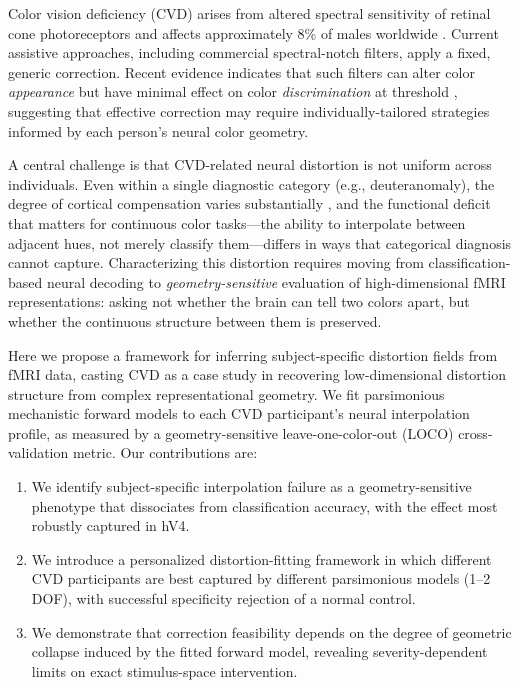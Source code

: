 \documentclass{article}
\begin{document}
Color vision deficiency (CVD) arises from altered spectral sensitivity of retinal cone photoreceptors and affects approximately 8\% of males worldwide \citep{machado2009}.
Current assistive approaches, including commercial spectral-notch filters, apply a fixed, generic correction.
Recent evidence indicates that such filters can alter color \emph{appearance} but have minimal effect on color \emph{discrimination} at threshold \citep{somers2024}, suggesting that effective correction may require individually-tailored strategies informed by each person's neural color geometry.

A central challenge is that CVD-related neural distortion is not uniform across individuals.
Even within a single diagnostic category (e.g., deuteranomaly), the degree of cortical compensation varies substantially \citep{tregillus2021}, and the functional deficit that matters for continuous color tasks---the ability to interpolate between adjacent hues, not merely classify them---differs in ways that categorical diagnosis cannot capture.
Characterizing this distortion requires moving from classification-based neural decoding to \emph{geometry-sensitive} evaluation of high-dimensional fMRI representations: asking not whether the brain can tell two colors apart, but whether the continuous structure between them is preserved.

Here we propose a framework for inferring subject-specific distortion fields from fMRI data, casting CVD as a case study in recovering low-dimensional distortion structure from complex representational geometry.
We fit parsimonious mechanistic forward models to each CVD participant's neural interpolation profile, as measured by a geometry-sensitive leave-one-color-out (LOCO) cross-validation metric.
Our contributions are:
\begin{enumerate}
    \item We identify subject-specific interpolation failure as a geometry-sensitive phenotype that dissociates from classification accuracy, with the effect most robustly captured in hV4.
    \item We introduce a personalized distortion-fitting framework in which different CVD participants are best captured by different parsimonious models (1--2 DOF), with successful specificity rejection of a normal control.
    \item We demonstrate that correction feasibility depends on the degree of geometric collapse induced by the fitted forward model, revealing severity-dependent limits on exact stimulus-space intervention.
\end{enumerate}
\end{document}
